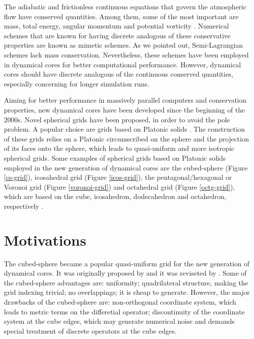 The adiabatic and frictionless continuous equations that govern the atmospheric flow have 
conserved quantities. Among them, some of the most important are mass, total energy, 
angular momentum and potential vorticity \citep{thuburn:2011}.
Numerical schemes that are known for having discrete analogous of these conservative properties
are known as mimetic schemes.
As we pointed out, Semi-Lagrangian schemes lack mass conservation. Nevertheless, 
these schemes have been employed in dynamical cores for better computational performance.
However, dynamical cores should have discrete analogous of the 
continuous conserved quantities, especially concerning for longer simulation runs.

Aiming for better performance in massively parallel computers and conservation properties, 
new dynamical cores have been developed since the beginning of the 2000s.
Novel spherical grids have been proposed, in order to avoid the pole problem.
A popular choice are grids based on Platonic solids \citep{stan:2012}.
The construction of these grids relies on a Platonic circumscribed on the sphere and 
the projection of its faces onto the sphere, which leads to quasi-uniform and more isotropic
spherical grids.
Some examples of spherical grids based on Platonic solids employed in the new generation
of dynamical cores are the cubed-sphere (Figure \ref{cs-grid}), icosahedral grid (Figure \ref{icos-grid}), 
the pentagonal/hexagonal or Voronoi grid (Figure \ref{voronoi-grid}) and octahedral grid (Figure \ref{octg-grid}),
which are based on the cube, icosahedron, dodecahedron and octahedron, respectively \citep{ullrich:2017}.

\section{Motivations}
The cubed-sphere became a popular quasi-uniform grid for the new generation of dynamical cores.
It was originally proposed by \citet{sadourny:1972} and it was reviseted by \citet{ronchi:1996}.
Some of the cubed-sphere advantages are: uniformity; quadrilateral structure, 
making the grid indexing trivial; no overlappings; it is cheap to generate.
However, the major drawbacks of the cubed-sphere are: non-orthogonal coordinate system, which
leads to metric terms on the differetial operator; discontinuity of the coordinate system
at the cube edges, which may generate numerical noise and
demands special treatment of discrete operators at the cube edges.

